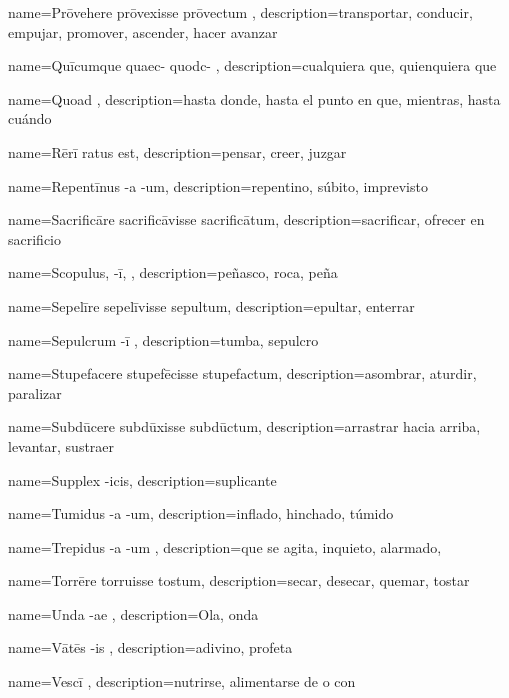 {name={Prōvehere prōvexisse prōvectum },
description={transportar, conducir, empujar, promover, ascender, hacer avanzar}}

{name={Quīcumque quaec- quodc- },
description={cualquiera que, quienquiera que}}

{name={Quoad },
description={hasta donde, hasta el punto en que, mientras, hasta cuándo}}


{name={Rērī ratus est},
description={pensar, creer, juzgar}}

{name={Repentīnus -a -um},
description={repentino, súbito, imprevisto}}

{name={Sacrificāre sacrificāvisse sacrificātum},
description={sacrificar, ofrecer en sacrificio}}

{name={Scopulus, -ī, },
description={peñasco, roca, peña}}

{name={Sepelīre sepelīvisse sepultum},
description={epultar, enterrar}}

{name={Sepulcrum -ī },
description={tumba, sepulcro}}

{name={Stupefacere stupefēcisse stupefactum},
description={asombrar, aturdir, paralizar}}

{name={Subdūcere subdūxisse subdūctum},
description={arrastrar hacia arriba, levantar, sustraer}}

{name={Supplex -icis},
description={suplicante}}

{name={Tumidus -a -um},
description={inflado, hinchado, túmido}}

{name={Trepidus -a -um },
description={que se agita, inquieto, alarmado, }}

{name={Torrēre torruisse tostum},
description={secar, desecar, quemar, tostar}}

{name={Unda -ae },
description={Ola, onda}}

{name={Vātēs -is },
description={adivino, profeta}}

{name={Vescī },
description={nutrirse, alimentarse de o con}}

